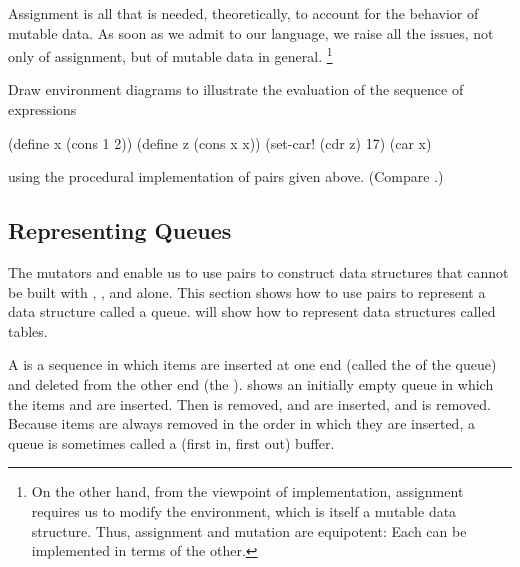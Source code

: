 Assignment is all that is needed, theoretically, to account for the behavior of mutable data.
As soon as we admit  to our language, we raise all the issues, not only of assignment, but of mutable data in general.%
\footnote{
	On the other hand, from the viewpoint of implementation, assignment requires us to modify the environment, which is itself a mutable data structure.
	Thus, assignment and mutation are equipotent:
	Each can be implemented in terms of the other.
}



\begin{exercise}
	\label{Exercise 3.20}
	Draw environment diagrams to illustrate the evaluation of the sequence of expressions
	\begin{scheme}
	  (define x (cons 1 2))
	  (define z (cons x x))
	  (set-car! (cdr z) 17)
	  (car x)
	  ~~
	\end{scheme}
	using the procedural implementation of pairs given above.
	(Compare .)
\end{exercise}



\subsection{Representing Queues}
\label{Section 3.3.2}

The mutators  and  enable us to use pairs to construct data structures that cannot be built with , , and  alone.
This section shows how to use pairs to represent a data structure called a queue.
 will show how to represent data structures called tables.

A  is a sequence in which items are inserted at one end (called the  of the queue) and deleted from the other end (the ).
 shows an initially empty queue in which the items  and  are inserted.
Then  is removed,  and  are inserted, and  is removed.
Because items are always removed in the order in which they are inserted, a queue is sometimes called a  (first in, first out) buffer.

